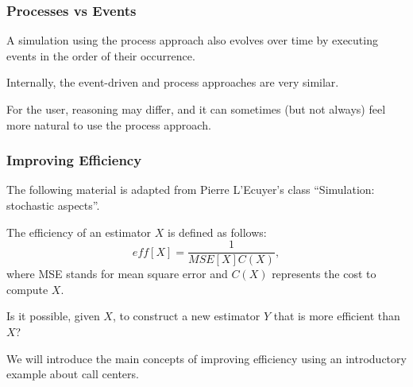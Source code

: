 \documentclass[t,usepdftitle=false]{beamer}
\begin{document}
\begin{frame}
	\frametitle{Processes vs Events}
	
	A simulation using the process approach also evolves over time by executing events in the order of their occurrence.
	
	\mbox{}
	
	Internally, the event-driven and process approaches are very similar.
	
	\mbox{}
	
	For the user, reasoning may differ, and it can sometimes (but not always) feel more natural to use the process approach.
	
	
	
\end{frame}

\begin{frame}
	\frametitle{Improving Efficiency}
	
	The following material is adapted from Pierre L'Ecuyer's class ``Simulation: stochastic aspects''.
	
	\mbox{}
	
	The efficiency of an estimator \(X\) is defined as follows:
	$$
	eff[X] = \frac{1}{MSE[X] C(X)},
	$$
	where MSE stands for mean square error and \(C(X)\) represents the cost to compute \(X\).
	
	\mbox{}
	
	Is it possible, given \(X\), to construct a new estimator \(Y\) that is more efficient than \(X\)?
	
	\mbox{}
	
	We will introduce the main concepts of improving efficiency using an introductory example about call centers.
	
\end{frame}
\end{document}

